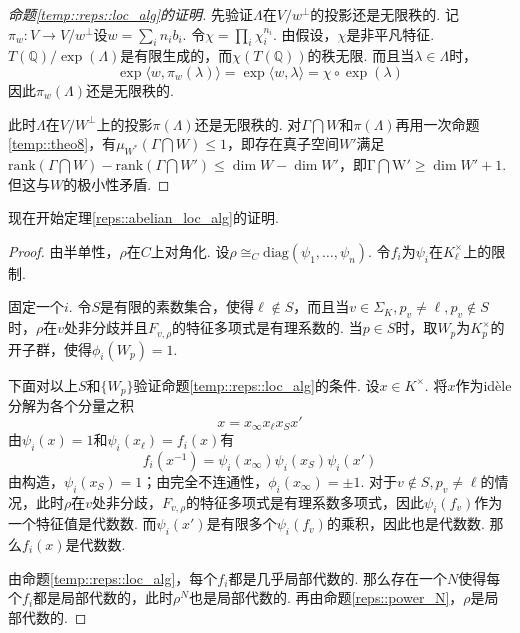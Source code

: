\begin{proof}[命题\ref{temp::reps::loc_alg}的证明]
    先验证$\Lambda$在$V/w^{\perp}$的投影还是无限秩的. 记$\pi_w: V\to V/w^{\perp}$设$w = \sum_i n_i b_i$. 令$\chi = \prod_i \chi_i^{n_i}$. 由假设，$\chi$是非平凡特征.
    $T(\mathbb{Q})/\exp(\Lambda)$是有限生成的，而$\chi(T(\mathbb{Q}))$的秩无限. 而且当$\lambda\in \Lambda$时，
    \begin{equation}
        \exp \langle w, \pi_w(\lambda)\rangle = \exp \langle w, \lambda\rangle = \chi \circ \exp (\lambda)
    \end{equation}
    因此$\pi_w(\Lambda)$还是无限秩的.

    此时$\Lambda$在$V/W^{\perp}$上的投影$\pi(\Lambda)$还是无限秩的. 对$\Gamma\bigcap W$和$\pi(\Lambda)$再用一次命题\ref{temp::theo8}，有$\mu_{W^{*}}(\Gamma\bigcap W)\leq 1$，即存在真子空间$W'$满足$\mathrm{rank}(\Gamma\bigcap W) - \mathrm{rank}(\Gamma\bigcap W') \leq \dim W - \dim W'$，即$\mathrm{\Gamma \bigcap W'}\geq \dim W' + 1$. 但这与$W$的极小性矛盾.

\end{proof}

现在开始定理\ref{reps::abelian_loc_alg}的证明.
\begin{proof}

    由半单性，$\rho$在$C$上对角化. 设$\rho \cong_{C} \mathrm{diag}(\psi_1,\ldots,\psi_n)$. 令$f_i$为$\psi_i$在$K_{\ell}^{\times}$上的限制.

    固定一个$i$.
    令$S$是有限的素数集合，使得$\ell\not\in S$，而且当$v\in \Sigma_K, p_v\neq \ell, p_v\not\in S$时，$\rho$在$v$处非分歧并且$F_{v,\rho}$的特征多项式是有理系数的.
    当$p\in S$时，取$W_p$为$K_{p}^{\times}$的开子群，使得$\phi_i(W_p)=1$.

    下面对以上$S$和$\{W_p\}$验证命题\ref{temp::reps::loc_alg}的条件. 设$x\in K^{\times}$. 将$x$作为idèle分解为各个分量之积
    \begin{equation}
        x = x_{\infty} x_{\ell} x_{S} x'
    \end{equation}
    由$\psi_i(x) = 1$和$\psi_i(x_{\ell}) = f_i(x)$有
    \begin{equation}
        f_i(x^{-1}) = \psi_i(x_{\infty})\psi_i(x_S)\psi_i(x')
    \end{equation}
    由构造，$\psi_i(x_S)=1$；由完全不连通性，$\phi_i(x_{\infty})=\pm 1$. 对于$v\not\in S, p_v\neq \ell$的情况，此时$\rho$在$v$处非分歧，$F_{v,\rho}$的特征多项式是有理系数多项式，因此$\psi_i(f_v)$作为一个特征值是代数数. 而$\psi_i(x')$是有限多个$\psi_i(f_v)$的乘积，因此也是代数数. 那么$f_i(x)$是代数数.

    由命题\ref{temp::reps::loc_alg}，每个$f_i$都是几乎局部代数的. 那么存在一个$N$使得每个$f_i$都是局部代数的，此时$\rho^N$也是局部代数的. 再由命题\ref{reps::power_N}，$\rho$是局部代数的.
\end{proof}
